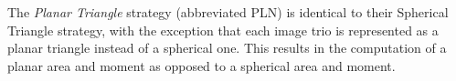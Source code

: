 


The \textit{Planar Triangle} strategy (abbreviated PLN) is identical to their Spherical Triangle strategy, with the exception that each image trio is represented as a planar triangle instead of a spherical one.
This results in the computation of a planar area and moment as opposed to a spherical area and moment.

